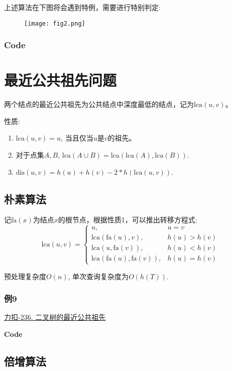 \documentclass{article}
\newcommand{\dis}{\text{dis}}
\newcommand{\lca}{\text{lca}}
\newcommand{\fa}{\text{fa}}
\newcommand{\inputcppfile}[1]{}
\begin{document}
上述算法在下图将会遇到特例，需要进行特别判定:
\begin{figure}[H]
    \centering
    \texttt{[image: fig2.png]}
\end{figure}

\subsubsection{Code}
\inputcppfile{Code_8.cpp}

\section{最近公共祖先问题}
两个结点的最近公共祖先为公共结点中深度最低的结点，记为$\lca(u,v)$。

性质:
\begin{enumerate}
    \item $\lca(u,v) = u$, 当且仅当$u$是$v$的祖先。
    \item 对于点集$A,B$, $\lca(A\cup B) = \lca(\lca(A),\lca(B))$.
    \item $\dis(u,v) = h(u)+h(v) - 2*h(\lca(u,v))$.
\end{enumerate}

\subsection{朴素算法}
记$\fa(x)$为结点$x$的根节点，根据性质1，可以推出转移方程式:
\begin{equation}
    \lca(u,v) = \begin{cases}
        u,                   & u = v       \\
        \lca(\fa(u),v),      & h(u)> h(v)  \\
        \lca(u,\fa(v)),      & h(u)< h(v)  \\
        \lca(\fa(u),\fa(v)), & h(u) = h(v)
    \end{cases}
\end{equation}

预处理复杂度$O(n)$, 单次查询复杂度为$O(h(T))$.
\subsubsection{例9}
\href{https://leetcode.cn/problems/lowest-common-ancestor-of-a-binary-tree/}{力扣-236. 二叉树的最近公共祖先}
\par\textbf{Code}\par
\inputcppfile{Code_9.cpp}

\subsection{倍增算法}
\end{document}
